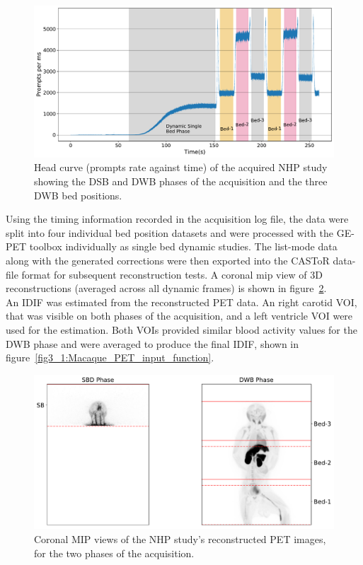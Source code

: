 \begin{figure} [ht!]
\centering
\includegraphics[scale=0.45,angle=0]{3_Results/3_1_DWB_Optimization/figures/3_1_Macaque_Head_curve_Phases.pdf}
\caption{Head curve (prompts rate against time) of the acquired NHP study showing the DSB and DWB phases of the acquisition and the three DWB bed positions.}
\label{fig3_1:Macaque_Head_Curve_Phases}
\end{figure}
%
Using the timing information recorded in the acquisition log file, the data were split into four individual bed position datasets and were processed with the GE-PET toolbox individually as single bed dynamic studies. The list-mode data along with the generated corrections were then exported into the CASToR data-file format for subsequent reconstruction tests. A coronal \gls{mip} view of 3D reconstructions (averaged across all dynamic frames) is shown in figure~\ref{fig3_1:Macaque_PET}. \\
An IDIF was estimated from the reconstructed PET data. An right carotid VOI, that was visible on both phases of the acquisition, and a left ventricle VOI were used for the estimation. Both VOIs provided similar blood activity values for the DWB phase and were averaged to produce the final IDIF, shown in figure~\ref{fig3_1:Macaque_PET_input_function}.
%
\begin{figure} [ht!]
\centering
\includegraphics[scale=0.45,angle=0]{3_Results/3_1_DWB_Optimization/figures/3_1_Macaque_PET.pdf}
\caption{Coronal MIP views of the NHP study's reconstructed PET images, for the two phases of the acquisition.}
\label{fig3_1:Macaque_PET}
\end{figure}

